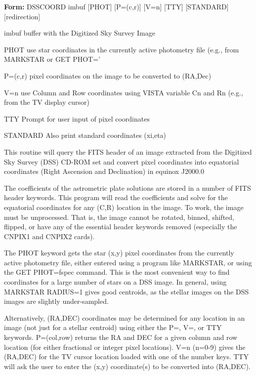 \begin{command}
  \item[\textbf{Form: } DSSCOORD imbuf {[PHOT]} {[P=(c,r)]} {[V=n]} {[TTY]} 
       {[STANDARD]} {[redirection]}\hfill]{}
  \item[imbuf]{buffer with the Digitized Sky Survey Image}
  \item[PHOT]{use star coordinates in the currently active
       photometry file (e.g., from MARKSTAR or GET PHOT='}
  \item[P=(c,r)]{pixel coordinates on the image to be converted to
       (RA,Dec)}
  \item[V=n]{use Column and Row coordinates using VISTA variable
       Cn and Rn (e.g., from the TV display cursor)}
  \item[TTY]{Prompt for user input of pixel coordinates}
  \item[STANDARD]{Also print standard coordinates (xi,eta)}
\end{command}

This routine will query the FITS header of an image extracted from the
Digitized Sky Survey (DSS) CD-ROM set and convert pixel coordinates into
equatorial coordinates (Right Ascension and Declination) in equinox J2000.0

The coefficients of the astrometric plate solutions are stored in a number
of FITS header keywords.  This program will read the coefficients and solve
for the equatorial coordinates for any (C,R) location in the image.  To
work, the image must be unprocessed.  That is, the image cannot be rotated,
binned, shifted, flipped, or have any of the essential header keywords
removed (especially the CNPIX1 and CNPIX2 cards).

The PHOT keyword gets the star (x,y) pixel coordinates from the currently
active photometry file, either entered using a program like MARKSTAR, or
using the GET PHOT=fspec command.  This is the most convenient way to find
coordinates for a large number of stars on a DSS image.  In general, using
MARKSTAR RADIUS=1 gives good centroids, as the stellar images on the DSS
images are slightly under-sampled.

Alternatively, (RA,DEC) coordinates may be determined for any location in
an image (not just for a stellar centroid) using either the P=, V=, or TTY
keywords.  P=(col,row) returns the RA and DEC for a given column and row
location (for either fractional or integer pixel locations).  V=n (n=0-9)
gives the (RA,DEC) for the TV cursor location loaded with one of the number
keys.  TTY will ask the user to enter the (x,y) coordinate(s) to be
converted into (RA,DEC).


